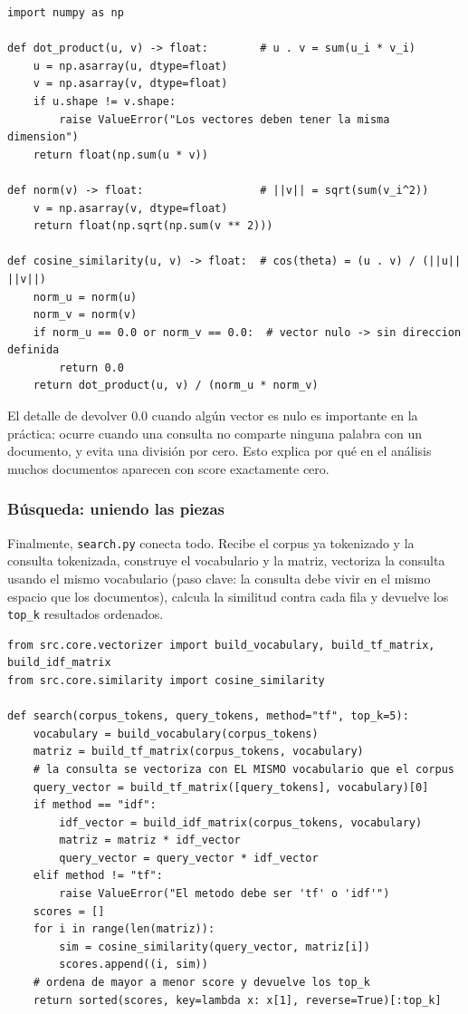 \documentclass[12pt,a4paper]{article}
\begin{document}
\begin{lstlisting}[caption={Producto punto, norma y similitud coseno (\texttt{similarity.py}).}]
import numpy as np

def dot_product(u, v) -> float:        # u . v = sum(u_i * v_i)
    u = np.asarray(u, dtype=float)
    v = np.asarray(v, dtype=float)
    if u.shape != v.shape:
        raise ValueError("Los vectores deben tener la misma dimension")
    return float(np.sum(u * v))

def norm(v) -> float:                  # ||v|| = sqrt(sum(v_i^2))
    v = np.asarray(v, dtype=float)
    return float(np.sqrt(np.sum(v ** 2)))

def cosine_similarity(u, v) -> float:  # cos(theta) = (u . v) / (||u|| ||v||)
    norm_u = norm(u)
    norm_v = norm(v)
    if norm_u == 0.0 or norm_v == 0.0:  # vector nulo -> sin direccion definida
        return 0.0
    return dot_product(u, v) / (norm_u * norm_v)
\end{lstlisting}

El detalle de devolver $0.0$ cuando algún vector es nulo es importante en la práctica: ocurre cuando una consulta no comparte ninguna palabra con un documento, y evita una división por cero. Esto explica por qué en el análisis muchos documentos aparecen con score exactamente cero.

\subsubsection{Búsqueda: uniendo las piezas}

Finalmente, \texttt{search.py} conecta todo. Recibe el corpus ya tokenizado y la consulta tokenizada, construye el vocabulario y la matriz, vectoriza la consulta usando el mismo vocabulario (paso clave: la consulta debe vivir en el mismo espacio que los documentos), calcula la similitud contra cada fila y devuelve los \texttt{top\_k} resultados ordenados.

\begin{lstlisting}[caption={Motor de búsqueda (\texttt{search.py}).}]
from src.core.vectorizer import build_vocabulary, build_tf_matrix, build_idf_matrix
from src.core.similarity import cosine_similarity

def search(corpus_tokens, query_tokens, method="tf", top_k=5):
    vocabulary = build_vocabulary(corpus_tokens)
    matriz = build_tf_matrix(corpus_tokens, vocabulary)
    # la consulta se vectoriza con EL MISMO vocabulario que el corpus
    query_vector = build_tf_matrix([query_tokens], vocabulary)[0]
    if method == "idf":
        idf_vector = build_idf_matrix(corpus_tokens, vocabulary)
        matriz = matriz * idf_vector
        query_vector = query_vector * idf_vector
    elif method != "tf":
        raise ValueError("El metodo debe ser 'tf' o 'idf'")
    scores = []
    for i in range(len(matriz)):
        sim = cosine_similarity(query_vector, matriz[i])
        scores.append((i, sim))
    # ordena de mayor a menor score y devuelve los top_k
    return sorted(scores, key=lambda x: x[1], reverse=True)[:top_k]
\end{lstlisting}
\end{document}
